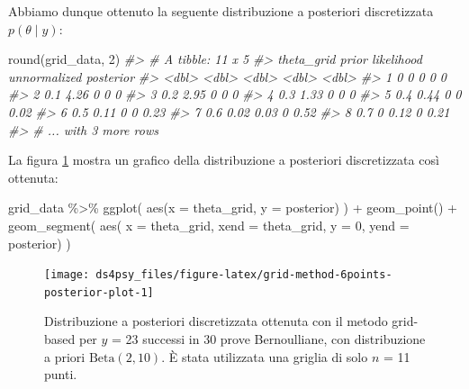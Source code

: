 \documentclass[
  11pt,
]{krantz}
\makeatletter
\newenvironment{Shaded}{\begin{snugshade}}{\end{snugshade}}
\newcommand{\AttributeTok}[1]{\textcolor[rgb]{0.61,0.61,0.61}{#1}}
\newcommand{\CommentTok}[1]{\textcolor[rgb]{0.37,0.37,0.37}{\textit{#1}}}
\newcommand{\DecValTok}[1]{\textcolor[rgb]{0.06,0.06,0.06}{#1}}
\newcommand{\FunctionTok}[1]{\textcolor[rgb]{0,0,0}{#1}}
\newcommand{\NormalTok}[1]{#1}
\newcommand{\SpecialCharTok}[1]{\textcolor[rgb]{0,0,0}{#1}}
\newenvironment{kframe}{%
\medskip{}
\setlength{\fboxsep}{.8em}
 \def\at@end@of@kframe{}%
 \ifinner\ifhmode%
  \def\at@end@of@kframe{\end{minipage}}%
  \begin{minipage}{\columnwidth}%
 \fi\fi%
 \def\FrameCommand##1{\hskip\@totalleftmargin \hskip-\fboxsep
 \colorbox{shadecolor}{##1}\hskip-\fboxsep
     \hskip-\linewidth \hskip-\@totalleftmargin \hskip\columnwidth}%
 \MakeFramed {\advance\hsize-\width
   \@totalleftmargin\z@ \linewidth\hsize
   \@setminipage}}%
 {\par\unskip\endMakeFramed%
 \at@end@of@kframe}
\renewenvironment{Shaded}{\begin{kframe}}{\end{kframe}}
\theoremstyle{definition}
\theoremstyle{definition}
\theoremstyle{definition}
\theoremstyle{definition}
\theoremstyle{remark}
\makeatother
\begin{document}
Abbiamo dunque ottenuto la seguente distribuzione a posteriori discretizzata \(p(\theta \mid y)\):

\begin{Shaded}
\begin{Highlighting}[]
\FunctionTok{round}\NormalTok{(grid\_data, }\DecValTok{2}\NormalTok{)}
\CommentTok{\#\textgreater{} \# A tibble: 11 x 5}
\CommentTok{\#\textgreater{}   theta\_grid prior likelihood unnormalized posterior}
\CommentTok{\#\textgreater{}        \textless{}dbl\textgreater{} \textless{}dbl\textgreater{}      \textless{}dbl\textgreater{}        \textless{}dbl\textgreater{}     \textless{}dbl\textgreater{}}
\CommentTok{\#\textgreater{} 1        0    0          0               0      0   }
\CommentTok{\#\textgreater{} 2        0.1  4.26       0               0      0   }
\CommentTok{\#\textgreater{} 3        0.2  2.95       0               0      0   }
\CommentTok{\#\textgreater{} 4        0.3  1.33       0               0      0   }
\CommentTok{\#\textgreater{} 5        0.4  0.44       0               0      0.02}
\CommentTok{\#\textgreater{} 6        0.5  0.11       0               0      0.23}
\CommentTok{\#\textgreater{} 7        0.6  0.02       0.03            0      0.52}
\CommentTok{\#\textgreater{} 8        0.7  0          0.12            0      0.21}
\CommentTok{\#\textgreater{} \# ... with 3 more rows}
\end{Highlighting}
\end{Shaded}

La figura \ref{fig:grid-method-6points-posterior-plot} mostra un grafico della distribuzione a posteriori discretizzata così ottenuta:

\begin{Shaded}
\begin{Highlighting}[]
\NormalTok{grid\_data }\SpecialCharTok{\%\textgreater{}\%} 
  \FunctionTok{ggplot}\NormalTok{(}
    \FunctionTok{aes}\NormalTok{(}\AttributeTok{x =}\NormalTok{ theta\_grid, }\AttributeTok{y =}\NormalTok{ posterior)}
\NormalTok{  ) }\SpecialCharTok{+}
  \FunctionTok{geom\_point}\NormalTok{() }\SpecialCharTok{+}
  \FunctionTok{geom\_segment}\NormalTok{(}
    \FunctionTok{aes}\NormalTok{(}
      \AttributeTok{x =}\NormalTok{ theta\_grid, }
      \AttributeTok{xend =}\NormalTok{ theta\_grid, }
      \AttributeTok{y =} \DecValTok{0}\NormalTok{, }
      \AttributeTok{yend =}\NormalTok{ posterior)}
\NormalTok{  )}
\end{Highlighting}
\end{Shaded}

\begin{figure}[h]

{\centering \texttt{[image: ds4psy\_files/figure-latex/grid-method-6points-posterior-plot-1]} 

}

\caption{Distribuzione a posteriori discretizzata ottenuta con il metodo grid-based per $y$ = 23 successi in 30 prove Bernoulliane, con distribuzione a priori $\mbox{Beta}(2, 10)$. È stata utilizzata una griglia di solo $n$ = 11 punti.}\label{fig:grid-method-6points-posterior-plot}
\end{figure}
\end{document}
